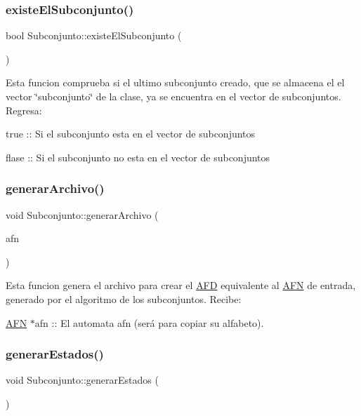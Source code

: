 \subsubsection{\texorpdfstring{existe\+El\+Subconjunto()}{existeElSubconjunto()}}
{\footnotesize\ttfamily bool Subconjunto\+::existe\+El\+Subconjunto (\begin{DoxyParamCaption}{ }\end{DoxyParamCaption})}

Esta funcion comprueba si el ultimo subconjunto creado, que se almacena el el vector \char`\"{}subconjunto\char`\"{} de la clase, ya se encuentra en el vector de subconjuntos. Regresa\+:
\begin{DoxyItemize}
\item true \+:\+: Si el subconjunto esta en el vector de subconjuntos
\item flase \+:\+: Si el subconjunto no esta en el vector de subconjuntos 
\end{DoxyItemize}\mbox{\label{class_subconjunto_a55803aec00fc222e2b7ad40b9fde53d2}} 
\subsubsection{\texorpdfstring{generar\+Archivo()}{generarArchivo()}}
{\footnotesize\ttfamily void Subconjunto\+::generar\+Archivo (\begin{DoxyParamCaption}\item[{\hyperlink{class_a_f_n}{A\+FN} $\ast$}]{afn }\end{DoxyParamCaption})}

Esta funcion genera el archivo para crear el \hyperlink{class_a_f_d}{A\+FD} equivalente al \hyperlink{class_a_f_n}{A\+FN} de entrada, generado por el algoritmo de los subconjuntos. Recibe\+:
\begin{DoxyItemize}
\item \hyperlink{class_a_f_n}{A\+FN} $\ast$afn \+:\+: El automata afn (será para copiar su alfabeto). 
\end{DoxyItemize}\mbox{\label{class_subconjunto_aff47f0dcf2f97880af46f1bf55d94525}} 
\subsubsection{\texorpdfstring{generar\+Estados()}{generarEstados()}}
{\footnotesize\ttfamily void Subconjunto\+::generar\+Estados (\begin{DoxyParamCaption}{ }\end{DoxyParamCaption})}

